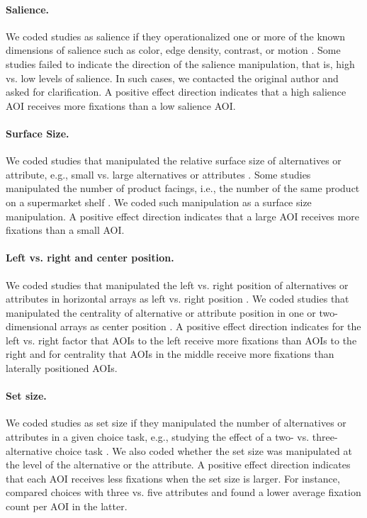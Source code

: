 \paragraph{Salience.} We coded studies as salience if they operationalized one or more of the known dimensions of salience such as color, edge density, contrast, or motion \citep{itti2000}. Some studies failed to indicate the direction of the salience manipulation, that is, high vs. low levels of salience. In such cases, we contacted the original author and asked for clarification. A positive effect direction indicates that a high salience AOI receives more fixations than a low salience AOI.

\paragraph{Surface Size.} We coded studies that manipulated the relative surface size of alternatives or attribute, e.g., small vs. large alternatives or attributes \citep{lohse1997a}. Some studies manipulated the number of product facings, i.e., the number of the same product on a supermarket shelf \citep{chandon2009a}. We coded such manipulation as a surface size manipulation. A positive effect direction indicates that a large AOI receives more fixations than a small AOI.

\paragraph{Left vs. right and center position.} We coded studies that manipulated the left vs. right position of alternatives or attributes in horizontal arrays as left vs. right position \citep{kreplin2014a}. We coded studies that manipulated the centrality of alternative or attribute position in one or two-dimensional arrays as center position \citep[experiment 1A \& 1B in][]{atalay2012a,meissner2016a}. A positive effect direction indicates for the left vs. right factor that AOIs to the left receive more fixations than AOIs to the right and for centrality that AOIs in the middle receive more fixations than laterally positioned AOIs.

\paragraph{Set size.} We coded studies as set size if they manipulated the number of alternatives or attributes in a given choice task, e.g., studying the effect of a two- vs. three-alternative choice task \citep{hong2016a}. We also coded whether the set size was manipulated at the level of the alternative or the attribute. A positive effect direction indicates that each AOI receives less fixations when the set size is larger. For instance, \cite{grebitus2015} compared choices with three vs. five attributes and found a lower average fixation count per AOI in the latter.

